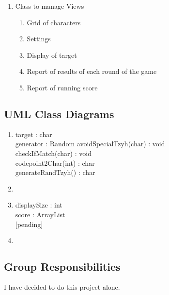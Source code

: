\documentclass[11pt,asymmetric]{article}
\begin{document}
\begin{enumerate}
\item Class to manage Views\begin{enumerate}
	\item Grid of characters
	\item Settings
	\item Display of target
	\item Report of results of each round of the game
	\item Report of running score
	\end{enumerate}

\end{enumerate}


\subsection{UML Class Diagrams}



\begin{enumerate}

\item {}
 {target : char\\
 generator : Random
 }
 {avoidSpecialTzyh(char) : void\\
 checkIfMatch(char) : void\\
 codepoint2Char(int) : char\\
 generateRandTzyh() : char}

\item {}

\item {}
 {displaySize : int\\
 score : ArrayList\\
 
}{[pending]}

\item {}

\end{enumerate}



\subsection{Group Responsibilities}

I have decided to do this project alone.
\end{document}
